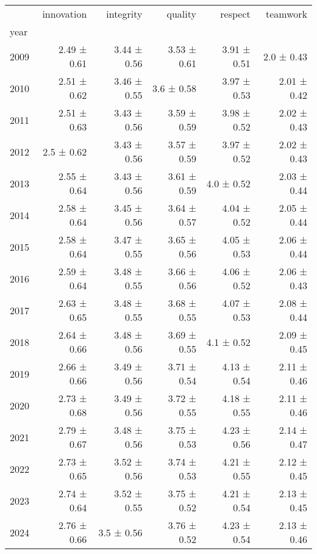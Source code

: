 \begin{tabular}{lrrrrr}
\toprule
 & innovation & integrity & quality & respect & teamwork \\
year &  &  &  &  &  \\
\midrule
2009 & 2.49 ± 0.61 & 3.44 ± 0.56 & 3.53 ± 0.61 & 3.91 ± 0.51 & 2.0 ± 0.43 \\
2010 & 2.51 ± 0.62 & 3.46 ± 0.55 & 3.6 ± 0.58 & 3.97 ± 0.53 & 2.01 ± 0.42 \\
2011 & 2.51 ± 0.63 & 3.43 ± 0.56 & 3.59 ± 0.59 & 3.98 ± 0.52 & 2.02 ± 0.43 \\
2012 & 2.5 ± 0.62 & 3.43 ± 0.56 & 3.57 ± 0.59 & 3.97 ± 0.52 & 2.02 ± 0.43 \\
2013 & 2.55 ± 0.64 & 3.43 ± 0.56 & 3.61 ± 0.59 & 4.0 ± 0.52 & 2.03 ± 0.44 \\
2014 & 2.58 ± 0.64 & 3.45 ± 0.56 & 3.64 ± 0.57 & 4.04 ± 0.52 & 2.05 ± 0.44 \\
2015 & 2.58 ± 0.64 & 3.47 ± 0.55 & 3.65 ± 0.56 & 4.05 ± 0.53 & 2.06 ± 0.44 \\
2016 & 2.59 ± 0.64 & 3.48 ± 0.55 & 3.66 ± 0.56 & 4.06 ± 0.52 & 2.06 ± 0.43 \\
2017 & 2.63 ± 0.65 & 3.48 ± 0.55 & 3.68 ± 0.55 & 4.07 ± 0.53 & 2.08 ± 0.44 \\
2018 & 2.64 ± 0.66 & 3.48 ± 0.56 & 3.69 ± 0.55 & 4.1 ± 0.52 & 2.09 ± 0.45 \\
2019 & 2.66 ± 0.66 & 3.49 ± 0.56 & 3.71 ± 0.54 & 4.13 ± 0.54 & 2.11 ± 0.46 \\
2020 & 2.73 ± 0.68 & 3.49 ± 0.56 & 3.72 ± 0.55 & 4.18 ± 0.55 & 2.11 ± 0.46 \\
2021 & 2.79 ± 0.67 & 3.48 ± 0.56 & 3.75 ± 0.53 & 4.23 ± 0.56 & 2.14 ± 0.47 \\
2022 & 2.73 ± 0.65 & 3.52 ± 0.56 & 3.74 ± 0.53 & 4.21 ± 0.55 & 2.12 ± 0.45 \\
2023 & 2.74 ± 0.64 & 3.52 ± 0.55 & 3.75 ± 0.52 & 4.21 ± 0.54 & 2.13 ± 0.45 \\
2024 & 2.76 ± 0.66 & 3.5 ± 0.56 & 3.76 ± 0.52 & 4.23 ± 0.54 & 2.13 ± 0.46 \\
\bottomrule
\end{tabular}
